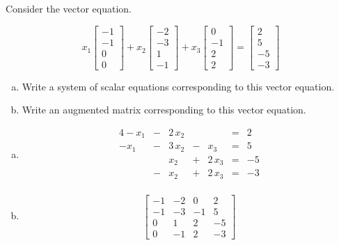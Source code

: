 
\begin{exerciseStatement}


Consider the vector equation.

\[ x_{1} \left[\begin{array}{c}
-1 \\
-1 \\
0 \\
0
\end{array}\right] + x_{2} \left[\begin{array}{c}
-2 \\
-3 \\
1 \\
-1
\end{array}\right] + x_{3} \left[\begin{array}{c}
0 \\
-1 \\
2 \\
2
\end{array}\right] = \left[\begin{array}{c}
2 \\
5 \\
-5 \\
-3
\end{array}\right] \]
\begin{enumerate}[(a)]
\item  Write a system of scalar equations corresponding to this vector equation. 
\item  Write an augmented matrix corresponding to this vector equation. 
\end{enumerate}
    
\end{exerciseStatement}
    
\begin{exerciseAnswer} 

\begin{enumerate}[(a)]
\item 
\begin{alignat*}{4} -x_{1} &-& 2 \, x_{2} & &  &=& 2 \\-x_{1} &-& 3 \, x_{2} &-& x_{3} &=& 5 \\ & & x_{2} &+& 2 \, x_{3} &=& -5 \\ &-& x_{2} &+& 2 \, x_{3} &=& -3 \\ \end{alignat*}
            
\item \[ \left[\begin{array}{ccc|c}
-1 & -2 & 0 & 2 \\
-1 & -3 & -1 & 5 \\
0 & 1 & 2 & -5 \\
0 & -1 & 2 & -3
\end{array}\right] \]
\end{enumerate}
    
\end{exerciseAnswer}
    
